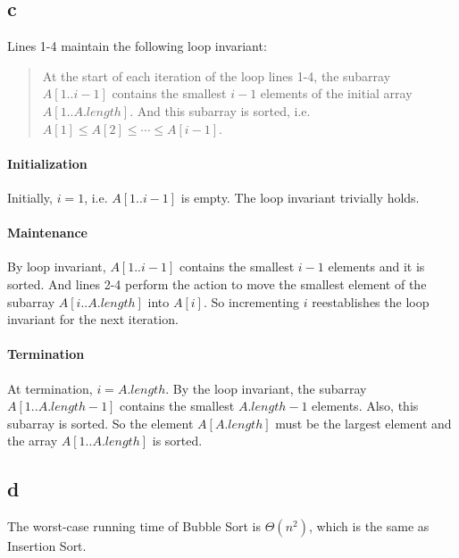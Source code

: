 \subsection{c}

Lines 1-4 maintain the following loop invariant:

\begin{quote}
At the start of each iteration of the  loop lines 1-4, the subarray $A[1..i - 1]$ contains the smallest $i - 1$ elements of the initial array $A[1..A.length]$.
And this subarray is sorted, i.e. $A[1] \leq A[2] \leq \cdots \leq A[i - 1]$.  
\end{quote}

\paragraph{Initialization}
Initially, $i = 1$, i.e. $A[1..i - 1]$ is empty.
The loop invariant trivially holds.

\paragraph{Maintenance}
By loop invariant, $A[1..i - 1]$ contains the smallest $i - 1$ elements and it is sorted.
And lines 2-4 perform the action to move the smallest element of the subarray $A[i..A.length]$ into $A[i]$.
So incrementing $i$ reestablishes the loop invariant for the next iteration.

\paragraph{Termination}
At termination, $i = A.length$.
By the loop invariant, the subarray $A[1..A.length - 1]$ contains the smallest $A.length - 1$ elements.
Also, this subarray is sorted.
So the element $A[A.length]$ must be the largest element and the array $A[1..A.length]$ is sorted.


\subsection{d}

The worst-case running time of Bubble Sort is $\Theta(n^2)$, which is the same as Insertion Sort.